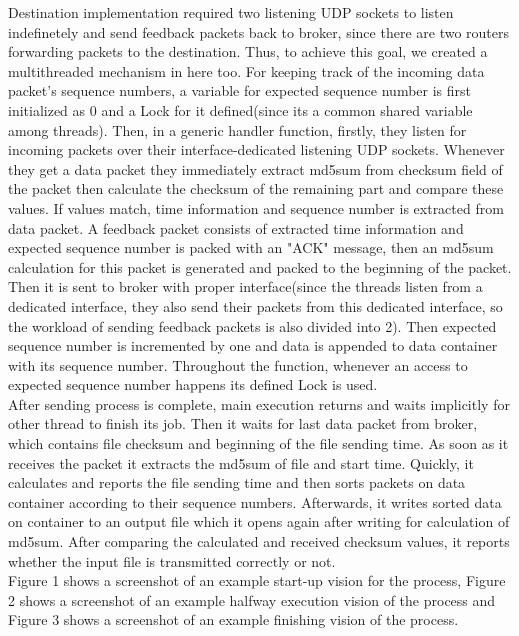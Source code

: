 \documentclass[conference]{IEEEtran}
\begin{document}
Destination implementation required two listening UDP sockets to listen indefinetely and send feedback packets back to broker, since there are two routers forwarding packets to the destination. Thus, to achieve this goal, we created a multithreaded mechanism in here too. For keeping track of the incoming data packet's sequence numbers, a variable for expected sequence number is first initialized as 0 and a Lock for it defined(since its a common shared variable among threads). Then, in a generic handler function, firstly, they listen for incoming packets over their interface-dedicated listening UDP sockets. Whenever they get a data packet they immediately extract md5sum from checksum field of the packet then calculate the checksum of the remaining part and compare these values. If values match, time information and sequence number is extracted from data packet. A feedback packet consists of extracted time information and expected sequence number is packed with an "ACK" message, then an md5sum calculation for this packet is generated and packed to the beginning of the packet. Then it is sent to broker with proper interface(since the threads listen from a dedicated interface, they also send their packets from this dedicated interface, so the workload of sending feedback packets is also divided into 2). Then expected sequence number is incremented by one and data is appended to data container with its sequence number. Throughout the function, whenever an access to expected sequence number happens its defined Lock is used. \\

After sending process is complete, main execution returns and waits implicitly for other thread to finish its job. Then it waits for last data packet from broker, which contains file checksum and beginning of the file sending time. As soon as it receives the packet  it extracts the md5sum of file and start time. Quickly, it calculates and reports the file sending time and then sorts packets on data container according to their sequence numbers. Afterwards, it writes sorted data on container to an output file which it opens again after writing for calculation of md5sum. After comparing the calculated and received checksum values, it reports whether the input file is transmitted correctly or not. \\

Figure 1 shows a screenshot of an example start-up vision for the process, Figure 2 shows a screenshot of an example halfway execution vision of the process and Figure 3 shows a screenshot of an example finishing vision of the process. \\
\end{document}
